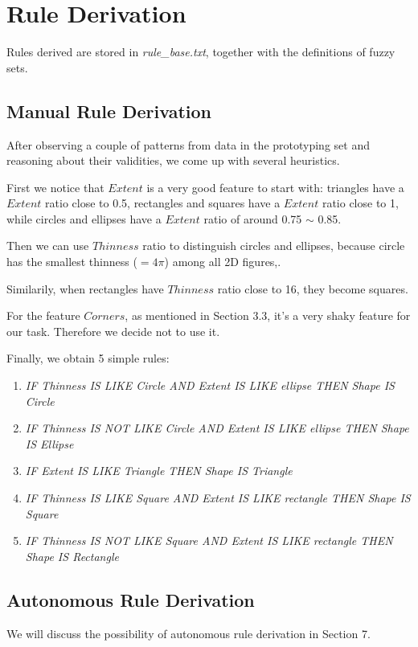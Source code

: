 \section{Rule Derivation}

Rules derived are stored in \textit{rule\_base.txt}, together with the definitions of fuzzy sets.

\subsection{Manual Rule Derivation}

After observing a couple of patterns from data in the prototyping set and reasoning about their validities, we come up with several heuristics.

First we notice that $Extent$ is a very good feature to start with: triangles have a $Extent$ ratio close to 0.5, rectangles and squares have a $Extent$ ratio close to 1, while circles and ellipses have a $Extent$ ratio of around 0.75 $\sim$ 0.85.

Then we can use $Thinness$ ratio to distinguish circles and ellipses, because circle has the smallest thinness ($=4\pi$) among all 2D figures,.

Similarily, when rectangles have $Thinness$ ratio close to 16, they become squares.

For the feature $Corners$, as mentioned in Section 3.3, it's a very shaky feature for our task. Therefore we decide not to use it.

Finally, we obtain 5 simple rules:

\begin{enumerate}

\item \textit{IF Thinness IS LIKE Circle AND Extent IS LIKE ellipse THEN Shape IS Circle}
\item \textit{IF Thinness IS NOT LIKE Circle AND Extent IS LIKE ellipse THEN Shape IS Ellipse}
\item \textit{IF Extent IS LIKE Triangle THEN Shape IS Triangle}
\item \textit{IF Thinness IS LIKE Square AND Extent IS LIKE rectangle THEN Shape IS Square}
\item \textit{IF Thinness IS NOT LIKE Square AND Extent IS LIKE rectangle THEN Shape IS Rectangle}

\end{enumerate}

\subsection{Autonomous Rule Derivation}

We will discuss the possibility of autonomous rule derivation in Section 7.

